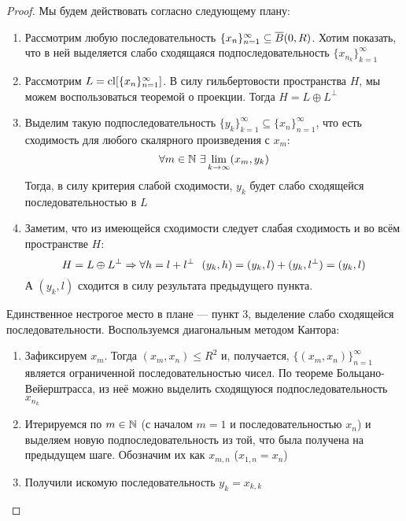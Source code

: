 \begin{proof}
	Мы будем действовать согласно следующему плану:
	\begin{enumerate}
		\item Рассмотрим любую последовательность $\{x_n\}_{n = 1}^\infty \subseteq \overline{B}(0, R)$. Хотим показать, что в ней выделяется слабо сходящаяся подпоследовательность $\{x_{n_k}\}_{k = 1}^\infty$
		
		\item Рассмотрим $L = \operatorname{cl} [\{x_n\}_{n = 1}^\infty]$. В силу гильбертовости пространства $H$, мы можем воспользоваться теоремой о проекции. Тогда $H = L \oplus L^\bot$
		
		\item Выделим такую подпоследовательность $\{y_k\}_{k = 1}^\infty \subseteq \{x_n\}_{n = 1}^\infty$, что есть сходимость для любого скалярного произведения с $x_m$:
		\[
			\forall m \in \mathbb{N}\ \exists \lim_{k \to \infty} (x_m, y_k)
		\]
		Тогда, в силу критерия слабой сходимости, $y_k$ будет слабо сходящейся последовательностью в $L$
		
		\item Заметим, что из имеющейся сходимости следует слабая сходимость и во всём пространстве $H$:
		\[
			 H = L \oplus L^\bot \Rightarrow \forall h = l + l^\bot\ \ (y_k, h) = (y_k, l) + (y_k, l^\bot) = (y_k, l)
		\]
		А $(y_k, l)$ сходится в силу результата предыдущего пункта.
	\end{enumerate}
	Единственное нестрогое место в плане --- пункт 3, выделение слабо сходящейся последовательности. Воспользуемся диагональным методом Кантора:
	\begin{enumerate}
		\item Зафиксируем $x_m$. Тогда $(x_m, x_n) \le R^2$ и, получается, $\{(x_m, x_n)\}_{n = 1}^\infty$ является ограниченной последовательностью чисел. По теореме Больцано-Вейерштрасса, из неё можно выделить сходящуюся подпоследовательность $x_{n_k}$
		
		\item Итерируемся по $m \in \mathbb{N}$ (с началом $m = 1$ и последовательностью $x_n$) и выделяем новую подпоследовательность из той, что была получена на предыдущем шаге. Обозначим их как $x_{m, n}$ ($x_{1, n} = x_n$)
		
		\item Получили искомую последовательность $y_k = x_{k, k}$
	\end{enumerate}
\end{proof}